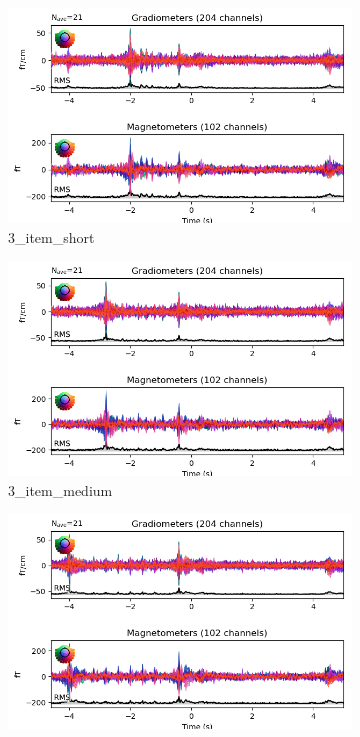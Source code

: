 \begin{figure}[htb]
    \medskip
    \begin{subfigure}{0.25\textwidth}
        \includegraphics[width=\linewidth]{images_report/sensor/evoked/3_item_short.png}
        \caption{3\_item\_short}
        \label{fig:3_item_short}
    \end{subfigure}\hfil %
    \begin{subfigure}{0.25\textwidth}
        \includegraphics[width=\linewidth]{images_report/sensor/evoked/3_item_medium.png}
        \caption{3\_item\_medium}
        \label{fig:3_item_medium}
    \end{subfigure}\hfil %
    \begin{subfigure}{0.25\textwidth}
        \includegraphics[width=\linewidth]{images_report/sensor/evoked/3_item_long.png}

\end{subfigure}
\end{figure}
